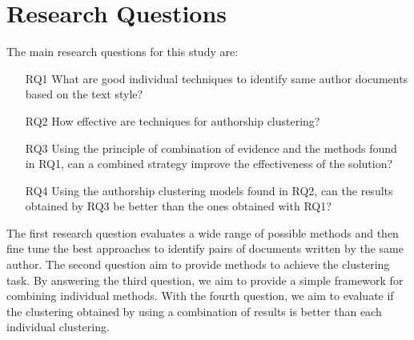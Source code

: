 \section{Research Questions}

The main research questions for this study are:

\begin{enumerate}
  \item[RQ1]
  What are good individual techniques to identify same author documents based on the text style?
  \item[RQ2]
  How effective are techniques for authorship clustering?
  \item[RQ3]
  Using the principle of combination of evidence and the methods found in RQ1, can a combined strategy improve the effectiveness of the solution?
  \item[RQ4]
  Using the authorship clustering models found in RQ2, can the results obtained by RQ3 be better than the ones obtained with RQ1?
\end{enumerate}

The first research question evaluates a wide range of possible methods and then fine tune the best approaches to identify pairs of documents written by the same author.
The second question aim to provide methods to achieve the clustering task.
By answering the third question, we aim to provide a simple framework for combining individual methods.
With the fourth question, we aim to evaluate if the clustering obtained by using a combination of results is better than each individual clustering.
